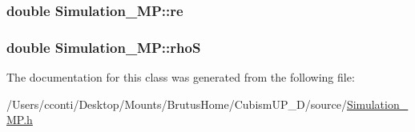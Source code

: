 \subsubsection[{re}]{\setlength{\rightskip}{0pt plus 5cm}double Simulation\+\_\+\+M\+P\+::re\hspace{0.3cm}{\ttfamily [protected]}}\label{class_simulation___m_p_a2f0afbb13c7e228fef62449a400a3f0f}
\hypertarget{class_simulation___m_p_ad93367b143b308c80614b236f8004223}{}
\subsubsection[{rho\+S}]{\setlength{\rightskip}{0pt plus 5cm}double Simulation\+\_\+\+M\+P\+::rho\+S\hspace{0.3cm}{\ttfamily [protected]}}\label{class_simulation___m_p_ad93367b143b308c80614b236f8004223}


The documentation for this class was generated from the following file\+:\begin{DoxyCompactItemize}
\item 
/\+Users/cconti/\+Desktop/\+Mounts/\+Brutus\+Home/\+Cubism\+U\+P\+\_\+D/source/\hyperlink{_simulation___m_p_8h}{Simulation\+\_\+\+M\+P.\+h}\end{DoxyCompactItemize}
